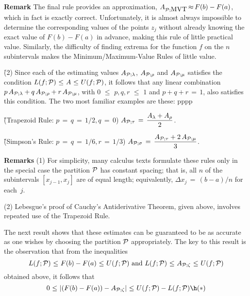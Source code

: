 {        {\bf Remark} The final rule provides an approximation, $A_{{\cal P}; \mbox{MVT}} \,{\approx}\, F(b)-F(a)$, which in fact is exactly correct.
    Unfortunately, it is almost always impossible to determine the corresponding values of the points $z_{j}$
    without already knowing the exact value of $F(b)-F(a)$ in advance, making this rule of little practical value.
    Similarly, the difficulty of finding extrema for the function $f$ on the $n$ subintervals makes the Minimum/Maximum-Value Rules of little value.


\V

        \h (2) Since each of the estimating values $A_{{\cal P}; {\lambda}}$, $A_{{\cal P}; {\rho}}$ and $A_{{\cal P}; {\mu}}$ satisfies the condition
    $L(f;{\cal P})\,\,{\leq}\,\,A\,\,{\leq}\,\,U(f;{\cal P})$, it follows that any linear combination
    $p\,A_{{\cal P}; {\lambda}} + q\,A_{{\cal P}; {\rho}} + r\,A_{{\cal P}; {\mu}}$,
    with $0\,\,{\leq}\,\,p, q, r\,\,{\leq}\,\,1$ and $p+q+r \,=\, 1$, also satisfies this condition. The two most familiar examples are these:
pppp
\VA

        \h \h (Trapezoid Rule: $p \,=\, q \,=\, 1/2, q \,=\, 0$)
    ${\displaystyle A_{{\cal P}; {\tau}} \,=\, \frac{A_{{\lambda}} + A_{{\rho}}}{2}}$.

        \h \h (Simpson's Rule: $p \,=\, q \,=\, 1/6, r \,=\, 1/3$)
    ${\displaystyle A_{{\cal P}; {\sigma}} \,=\, \frac{A_{{\cal P}; {\tau}} + 2\,A_{{\cal P}; {\mu}}}{3}}$.

\V

        {\bf Remarks} (1) For simplicity, many calculus texts formulate these rules only in the special case the partition ${\cal P}$ has constant spacing;
    that is, all $n$ of the subintervals $[x_{j-1},x_{j}]$ are of equal length; equivalently, ${\Delta}x_{j} \,=\, (b-a)/n$ for each~$j$.

\V

        (2) Lebesgue's proof of Cauchy's Antiderivative Theorem, given above, involves repeated use of the Trapezoid Rule.

\VV

        The next result shows that these estimates can be guaranteed to be as accurate as one wishes by choosing the partition ${\cal P}$ appropriately.
    The key to this result is the observation that from the inequalities 
        \begin{displaymath}
        L(f;{\cal P})\,\,{\leq}\,\,F(b)-F(a)\,\,{\leq}\,\,U(f;{\cal P})
    \mbox{ and }
        L(f;{\cal P})\,\,{\leq}\,\,A_{{\cal P}; {\zeta}}\,\,{\leq}\,\,U(f;{\cal P})
        \end{displaymath}
    obtained above, it follows that
        \begin{displaymath}
        0\,\,{\leq}\,\,|(F(b)-F(a)) - A_{{\cal P}; {\zeta}}|\,\,{\leq}\,\,U(f;{\cal P})-L(f;{\cal P}) \h ({\ast})
        \end{displaymath}

}
